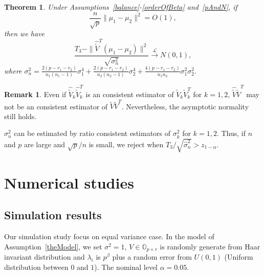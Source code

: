\documentclass[review]{elsarticle}
\theoremstyle{plain}
\newtheorem{theorem}{\quad\quad Theorem}
\theoremstyle{definition}
\newtheorem{remark}{\quad\quad Remark}
\theoremstyle{remark}
\begin{document}
\begin{theorem}\label{myXiaopanpan}
    Under Assumptions~\ref{balance}-\ref{orderOfBeta} and~\ref{pAndN},
     if 
    $$\frac{n}{\sqrt{p}}\|\mu_1-\mu_2\|^2=O(1),$$
     then we have
\begin{equation*}
    \frac{T_3-\|\hat{\tilde{V}}^T(\mu_1-\mu_2)\|^2}{\sqrt{\sigma_n^2}}\xrightarrow{\mathcal{L}} N(0,1),
\end{equation*}
where
$\sigma_n^2=\frac{2(p-r_1-r_2)}{n_1(n_1-1)}\sigma_1^4+\frac{2(p-r_1-r_2)}{n_2(n_2-1)}\sigma_2^4+\frac{4(p-r_1-r_2)}{n_1n_2}\sigma_1^2\sigma_2^2$.
\end{theorem}
\begin{remark}
    Even if $\hat{\tilde{V}}_k\hat{\tilde{V}}_k^T$ is an consistent estimator of $\tilde{V}_k\tilde{V}_k^T$ for $k=1,2$, $\hat{\tilde{V}}\hat{\tilde{V}}^T$ may not be an consistent estimator of $\tilde{V}\tilde{V}^T$.
    Nevertheless, the asymptotic normality still holds.
\end{remark}

 $\sigma_n^2$ can be estimated by ratio consistent estimators of $\sigma^2_k$ for $k=1,2$. Thus, if $n$ and $p$ are large and ${\sqrt{p}}/{n}$ is small, we reject when $T_3/\sqrt{\hat{\sigma}_n^2}>z_{1-\alpha}$. 




\section{Numerical studies}
\subsection{Simulation results}

Our simulation study focus on equal variance case. 
In the model of Assumption~\ref{theModel}, we set $\sigma^2=1$, 
$V\in\mathbb{O}_{p\times r}$ is randomly generate from Haar invariant distribution and $\lambda_i$ is $p^{\beta}$ plus a random error from $U(0,1)$ (Uniform distribution between $0$ and $1$).
The nominal level $\alpha=0.05$.
\end{document}
